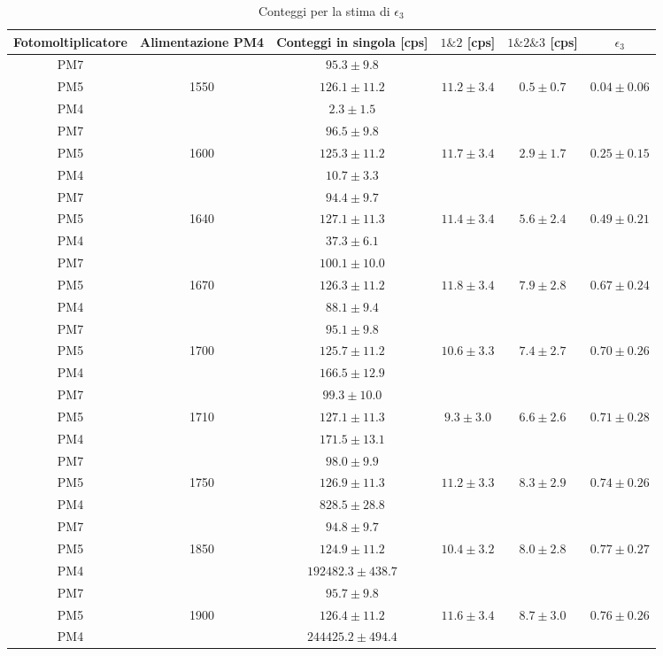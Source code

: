 \documentclass{article}
\begin{document}
\begin{table}[H]
\centering
\begin{tabular}{|c|c|c|c|c|c|}
\hline
Fotomoltiplicatore & Alimentazione PM4 & Conteggi in singola [cps] & $1 \& 2$  [cps]&  $1\&2\& 3$ [cps]& $\epsilon_3$\\ 
\hline
\hline 
PM7 & & $95.3 \pm 9.8$ &  & & \\ 
PM5 & 1550 & $126.1 \pm 11.2$ & $11.2 \pm 3.4$  & $0.5 \pm 0.7$& $0.04 \pm 0.06$\\ 
PM4 & & $2.3 \pm 1.5$ &  & &\\ 
\hline 
PM7 & & $96.5 \pm 9.8$ &  & & \\ 
PM5 & 1600 & $125.3 \pm 11.2$ & $11.7 \pm 3.4$  & $2.9 \pm 1.7$& $0.25 \pm 0.15$\\ 
PM4 & & $10.7 \pm 3.3$ &  & &\\ 
\hline 
PM7 & & $94.4 \pm 9.7$ &  & & \\ 
PM5 & 1640 & $127.1 \pm 11.3$ & $11.4 \pm 3.4$  & $5.6 \pm 2.4$& $0.49 \pm 0.21$\\ 
PM4 & & $37.3 \pm 6.1$ &  & &\\ 
\hline 
PM7 & & $100.1 \pm 10.0$ &  & & \\ 
PM5 & 1670 & $126.3 \pm 11.2$ & $11.8 \pm 3.4$  & $7.9 \pm 2.8$& $0.67 \pm 0.24$\\ 
PM4 & & $88.1 \pm 9.4$ &  & &\\ 
\hline 
PM7 & & $95.1 \pm 9.8$ &  & & \\ 
PM5 & 1700 & $125.7 \pm 11.2$ & $10.6 \pm 3.3$  & $7.4 \pm 2.7$& $0.70 \pm 0.26$\\ 
PM4 & & $166.5 \pm 12.9$ &  & &\\ 
\hline 
PM7 & & $99.3 \pm 10.0$ &  & & \\ 
PM5 & 1710 & $127.1 \pm 11.3$ & $9.3 \pm 3.0$  & $6.6 \pm 2.6$& $0.71 \pm 0.28$\\ 
PM4 & & $171.5 \pm 13.1$ &  & &\\ 
\hline 
PM7 & & $98.0 \pm 9.9$ &  & & \\ 
PM5 & 1750 & $126.9 \pm 11.3$ & $11.2 \pm 3.3$  & $8.3 \pm 2.9$& $0.74 \pm 0.26$\\ 
PM4 & & $828.5 \pm 28.8$ &  & &\\ 
\hline 
PM7 & & $94.8 \pm 9.7$ &  & & \\ 
PM5 & 1850 & $124.9 \pm 11.2$ & $10.4 \pm 3.2$  & $8.0 \pm 2.8$& $0.77 \pm 0.27$\\ 
PM4 & & $192482.3 \pm 438.7$ &  & &\\ 
\hline 
PM7 & & $95.7 \pm 9.8$ &  & & \\ 
PM5 & 1900 & $126.4 \pm 11.2$ & $11.6 \pm 3.4$  & $8.7 \pm 3.0$& $0.76 \pm 0.26$\\ 
PM4 & & $244425.2 \pm 494.4$ &  & &\\ 
\hline
\end{tabular}
\caption{Conteggi per la stima di $\epsilon_3$}\label{tabepsilon3}
\end{table}
\end{document}

